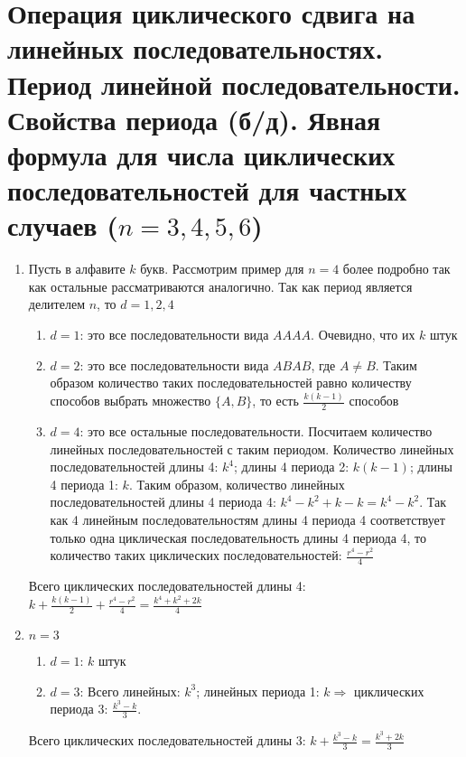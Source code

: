 \section{Операция циклического сдвига на линейных последовательностях. Период линейной последовательности. Свойства периода (б/д). Явная формула для числа циклических последовательностей для частных случаев ($n = 3, 4, 5, 6$)}
\begin{enumerate}
    \item Пусть в алфавите $k$ букв. Рассмотрим пример для $n=4$ более подробно так как остальные рассматриваются аналогично. Так как период является делителем $n$, то $d=1,2,4$
\begin{enumerate}
    \item $d=1$: это все последовательности вида $AAAA$. Очевидно, что их $k$ штук
    \item $d=2$: это все последовательности вида $ABAB$, где $A \neq B$. Таким образом количество таких последовательностей равно количеству способов выбрать множество $\{A, B\}$, то есть $\frac{k(k-1)}{2}$ способов
    \item $d=4$: это все остальные последовательности. Посчитаем количество линейных последовательностей с таким периодом. Количество линейных последовательностей длины 4: $k^4$; длины 4 периода 2: $k(k-1)$; длины 4 периода 1: $k$. Таким образом, количество линейных последовательностей длины 4 периода 4: $k^4-k^2+k-k=k^4-k^2$. Так как 4 линейным последовательностям длины 4 периода 4 соответствует только одна циклическая последовательность длины 4 периода 4, то количество таких циклических последовательностей: $\frac{r^4-r^2}{4}$
\end{enumerate}
\par Всего циклических последовательностей длины 4: $k+\frac{k(k-1)}{2}+\frac{r^4-r^2}{4}=\frac{k^4+k^2+2k}{4}$
\item $n=3$
\begin{enumerate}
    \item $d=1$: $k$ штук
    \item $d=3$: Всего линейных: $k^3$; линейных периода 1: $k \Rightarrow$ циклических периода 3: $\frac{k^3-k}{3}$.
\end{enumerate}
\par Всего циклических последовательностей длины 3: $k+\frac{k^3-k}{3}=\frac{k^3+2k}{3}$


\end{enumerate}
